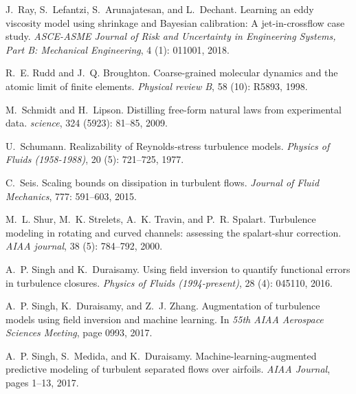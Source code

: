 \documentclass[a4paper]{ar-1col}
\begin{document}
\begin{thebibliography}{82}
J.~Ray, S.~Lefantzi, S.~Arunajatesan, and L.~Dechant.
\newblock Learning an eddy viscosity model using shrinkage and {Bayesian}
  calibration: A jet-in-crossflow case study.
\newblock \emph{{ASCE-ASME} Journal of Risk and Uncertainty in Engineering
  Systems, {Part B}: Mechanical Engineering}, 4 (1): 011001,
  2018.

R.~E. Rudd and J.~Q. Broughton.
\newblock Coarse-grained molecular dynamics and the atomic limit of finite
  elements.
\newblock \emph{Physical review B}, 58 (10): R5893, 1998.

M.~Schmidt and H.~Lipson.
\newblock Distilling free-form natural laws from experimental data.
\newblock \emph{science}, 324 (5923): 81--85, 2009.

U.~Schumann.
\newblock Realizability of {Reynolds}-stress turbulence models.
\newblock \emph{Physics of Fluids (1958-1988)}, 20 (5):
  721--725, 1977.

C.~Seis.
\newblock Scaling bounds on dissipation in turbulent flows.
\newblock \emph{Journal of Fluid Mechanics}, 777: 591--603, 2015.

M.~L. Shur, M.~K. Strelets, A.~K. Travin, and P.~R. Spalart.
\newblock Turbulence modeling in rotating and curved channels: assessing the
  spalart-shur correction.
\newblock \emph{AIAA journal}, 38 (5): 784--792, 2000.

A.~P. Singh and K.~Duraisamy.
\newblock Using field inversion to quantify functional errors in turbulence
  closures.
\newblock \emph{Physics of Fluids (1994-present)}, 28 (4):
  045110, 2016.

A.~P. Singh, K.~Duraisamy, and Z.~J. Zhang.
\newblock Augmentation of turbulence models using field inversion and machine
  learning.
\newblock In \emph{55th AIAA Aerospace Sciences Meeting}, page 0993,
  2017{}.

A.~P. Singh, S.~Medida, and K.~Duraisamy.
\newblock Machine-learning-augmented predictive modeling of turbulent separated
  flows over airfoils.
\newblock \emph{AIAA Journal}, pages 1--13, 2017{}.


\end{thebibliography}
\end{document}
